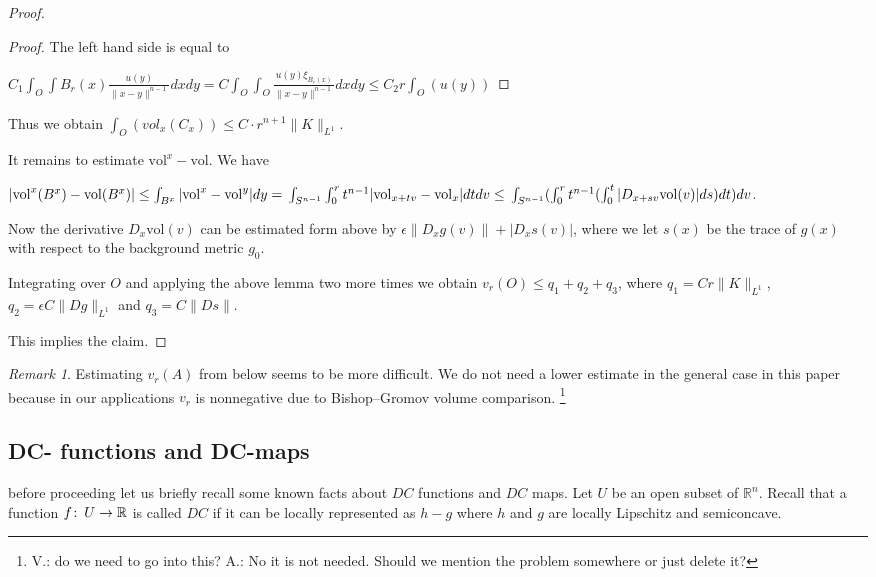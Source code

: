 \documentclass[12pt,leqno,intlimits]{amsart}
\numberwithin{equation}{section}
\theoremstyle{definition}
\theoremstyle{remark}
\newtheorem{rem}[thm]{Remark}
\newcommand{\vol}{\mathrm{vol}}
\newcommand{\R}{\mathbb{R}}
\def\co{\colon\thinspace}
\begin{document}
\begin{proof}
     \begin{proof}
     The left hand side is equal to

     $C_1 \int _O \int B_r (x) \frac {u(y)}  {\|x-y\| ^{n-1}} dx dy = C \int _O \int _O \frac {u(y) \xi _{B_r (x)}}
     {\|x-y\| ^{n-1}} dx dy \leq C_2 r  \int _O (u(y))$
     \end{proof}


      Thus we obtain $\int _O (vol _x (C_x)) \leq C \cdot r^{n+1} \|K\| _{L^1}$.


      It remains to estimate $\vol ^x - \vol$. We have

      $|\vol ^x (B^x) -\vol (B^x)| \leq \int _ {B^x} |\vol ^x -\vol ^y| dy = \\
      \int _{S^{n-1}} \int _0 ^r  t^{n-1} | \vol _{x+tv} - \vol _x| dt dv \leq  \\
       \int _{ S^{n-1}} (\int _0 ^r t^{n-1} (\int _0 ^t  |D_{x+sv} \vol (v)| ds) dt) dv$.

      Now the derivative $D_x \vol (v)$ can be estimated form above by $\epsilon \|D_xg (v)\| + | D_x s (v)|$,
      where we let $s(x)$ be the trace of $g(x)$ with respect to the background metric $g_0$.

      Integrating over $O$ and applying the above lemma two more times we obtain
      $v_r (O) \leq q_1 +q_2 +q_3$, where
      $q_1 = C r \|K\| _{L^1}$, $q_2 = \epsilon C \| Dg\| _{L^1} $ and $q_3 = C \|Ds\|$.

      This implies the claim.
    \end{proof}


\begin{rem}
Estimating  $v_r (A)$ from below seems to be more difficult.  We do not need a lower estimate  in the general case in this paper because in our applications $v_r$ is nonnegative due to Bishop--Gromov volume comparison. \footnote{ {V.:\color{red} do we need to go into this?} A.: No it is not needed. Should we mention the problem somewhere or just delete it?  }
\end{rem}

\subsection{DC- functions and DC-maps}
before proceeding let us briefly recall some known facts about $DC$ functions and $DC$ maps.
Let $U$ be an open subset of $\R^n$.
Recall that a function $f\co U\to \R$ is called $DC$ if it can be locally represented as  $h-g$ where $h$ and $g$ are locally Lipschitz and semiconcave.
\end{document}
